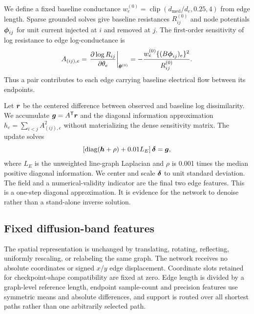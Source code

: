 We define a fixed baseline conductance
$w_e^{(0)}=\operatorname{clip}(d_{\mathrm{med}}/d_e,0.25,4)$ from edge length.
Sparse grounded solves give baseline resistances $R_{ij}^{(0)}$ and node
potentials $\boldsymbol{\phi}_{ij}$ for unit current injected at $i$ and removed at
$j$. The first-order sensitivity of log resistance to edge log-conductance is
\begin{equation}
    A_{(ij),e}
    =
    \left.
    \frac{\partial\log R_{ij}}{\partial\theta_e}
    \right|_{\boldsymbol{\theta}^{(0)}}
    =-
    \frac{w_e^{(0)}\{(B\boldsymbol{\phi}_{ij})_e\}^2}
    {R_{ij}^{(0)}}.
    \label{eq:resistance-sensitivity}
\end{equation}
Thus a pair contributes to each edge carrying baseline electrical flow between
its endpoints.

Let $\boldsymbol{r}$ be the centered difference between observed and baseline log
dissimilarity. We accumulate $\boldsymbol{g}=A^\mathsf{T}\boldsymbol{r}$ and the diagonal
information approximation $h_e=\sum_{i<j}A_{(ij),e}^2$ without materializing
the dense sensitivity matrix. The update solves
\begin{equation}
    \left[
      \operatorname{diag}(\boldsymbol{h}+\rho)+0.01L_E
    \right]\boldsymbol{\delta}=\boldsymbol{g},
    \label{eq:linearized-initializer}
\end{equation}
where $L_E$ is the unweighted line-graph Laplacian and $\rho$ is 0.001 times
the median positive diagonal information. We center and scale $\boldsymbol{\delta}$
to unit standard deviation. The field and a numerical-validity indicator are
the final two edge features. This is a one-step diagonal approximation. It is
evidence for the network to denoise rather than a stand-alone inverse
solution.

\subsection{Fixed diffusion-band features}

The spatial representation is unchanged by translating, rotating, reflecting,
uniformly rescaling, or relabeling the same graph. The network receives no
absolute coordinates or signed $x$/$y$ edge displacement. Coordinate slots
retained for checkpoint-shape compatibility are fixed at zero. Edge length is
divided by a graph-level reference length, endpoint sample-count and precision
features use symmetric means and absolute differences, and support is routed
over all shortest paths rather than one arbitrarily selected path.

